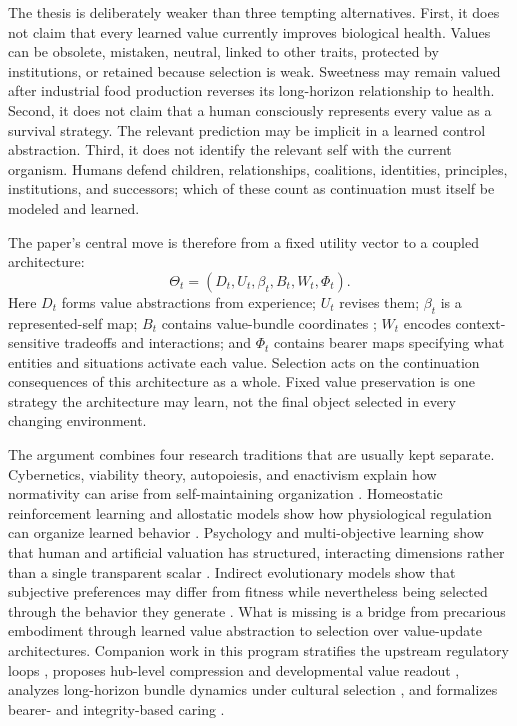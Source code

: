 \documentclass[11pt]{article}
\begin{document}
The thesis is deliberately weaker than three tempting alternatives. First, it does not claim that every learned value currently improves biological health. Values can be obsolete, mistaken, neutral, linked to other traits, protected by institutions, or retained because selection is weak. Sweetness may remain valued after industrial food production reverses its long-horizon relationship to health. Second, it does not claim that a human consciously represents every value as a survival strategy. The relevant prediction may be implicit in a learned control abstraction. Third, it does not identify the relevant self with the current organism. Humans defend children, relationships, coalitions, identities, principles, institutions, and successors; which of these count as continuation must itself be modeled and learned.

The paper's central move is therefore from a fixed utility vector to a coupled architecture:
\begin{equation}
\Theta_t=(D_t,U_t,\beta_t,B_t,W_t,\Phi_t).
\label{eq:architecture}
\end{equation}
Here $D_t$ forms value abstractions from experience; $U_t$ revises them; $\beta_t$ is a represented-self map; $B_t$ contains value-bundle coordinates \citep{zarncke2026vbd}; $W_t$ encodes context-sensitive tradeoffs and interactions; and $\Phi_t$ contains bearer maps \citep{zarncke2026uoc} specifying what entities and situations activate each value. Selection acts on the continuation consequences of this architecture as a whole. Fixed value preservation is one strategy the architecture may learn, not the final object selected in every changing environment.

The argument combines four research traditions that are usually kept separate. Cybernetics, viability theory, autopoiesis, and enactivism explain how normativity can arise from self-maintaining organization \citep{ashby1952,aubin1991,dipaolo2005,barandiaran2009,beer2023}. Homeostatic reinforcement learning and allostatic models show how physiological regulation can organize learned behavior \citep{sterling2012,keramati2014,laurencon2021,yoshida2024}. Psychology and multi-objective learning show that human and artificial valuation has structured, interacting dimensions rather than a single transparent scalar \citep{schwartz1992,hayes2022,millidge2024}. Indirect evolutionary models show that subjective preferences may differ from fitness while nevertheless being selected through the behavior they generate \citep{dekel2007,alger2013}. What is missing is a bridge from precarious embodiment through learned value abstraction to selection over value-update architectures. Companion work in this program stratifies the upstream regulatory loops \citep{zarncke2025stratification}, proposes hub-level compression and developmental value readout \citep{zarncke2025lhv,zarncke2026lhcv}, analyzes long-horizon bundle dynamics under cultural selection \citep{zarncke2026vbd}, and formalizes bearer- and integrity-based caring \citep{zarncke2026uoc}.
\end{document}
